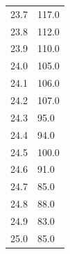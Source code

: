 \begin{minipage}{\linewidth}
\begin{table}[H]
\begin{tabular}{ll}
        23.7&		117.0 \\
        23.8&		112.0 \\
        23.9&		110.0 \\
        24.0&		105.0 \\
        24.1&		106.0 \\
        24.2&		107.0 \\
        24.3&		95.0 \\
        24.4&		94.0\\
        24.5&		100.0\\
        24.6&		91.0\\
        24.7&		85.0\\
        24.8&		88.0\\
        24.9&		83.0\\
        25.0&		85.0\\
        \bottomrule   
    \end{tabular}
    
    \label{tab:1}
\end{table}
\end{minipage}

